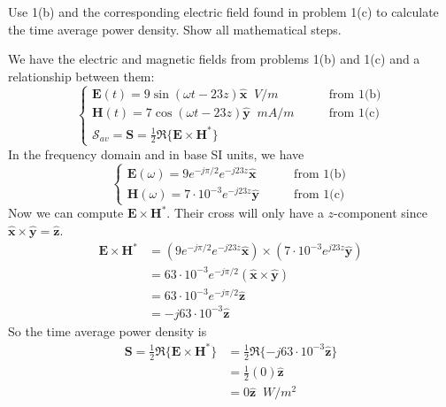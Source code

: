 \documentclass[11pt]{article}
\begin{document}
\begin{homeworkProblem}

Use 1(b) and the corresponding electric field found in problem 1(c) to calculate the time average power density. 
Show all mathematical steps. \vspace{1\baselineskip}

\solution

We have the electric and magnetic fields from problems 1(b) and 1(c) and a relationship between them:
\[\begin{cases}
    \mathbf{E}(t) = 9 \sin (\omega t - 23 z) \hat{\mathbf{x}} \;\; \unit{V/m} &\quad\quad \text{from 1(b)}  \\
    \mathbf{H}(t) = 7 \cos (\omega t - 23 z) \hat{\mathbf{y}} \;\; \unit{mA/m} &\quad\quad \text{from 1(c)} \\
    \bm{\mathscr{S}}_{av} = \mathbf{S} = \frac{1}{2} \Re \{\mathbf{E} \times \mathbf{H}^*\}
\end{cases}\]
In the frequency domain and in base SI units, we have
\[\begin{cases}
    \mathbf{E}(\omega) = 9 e^{-j \pi/2} e^{-j 23 z} \hat{\mathbf{x}} &\quad\quad \text{from 1(b)}  \\
    \mathbf{H}(\omega) = 7\cdot10^{-3} e^{-j 23 z} \hat{\mathbf{y}} &\quad\quad \text{from 1(c)}
\end{cases}\]
Now we can compute $\mathbf{E}\times \mathbf{H}^*$. Their cross will only have a $z$-component since $\hat{\mathbf{x}} \times \hat{\mathbf{y}} = \hat{\mathbf{z}}$.
\begin{align*}
    \mathbf{E} \times \mathbf{H}^* &= (9 e^{-j \pi/2} e^{-j 23 z} \hat{\mathbf{x}}) \times (7\cdot10^{-3} e^{j 23 z} \hat{\mathbf{y}}) \\
    &= 63\cdot10^{-3} e^{-j \pi/2} (\hat{\mathbf{x}} \times \hat{\mathbf{y}}) \\
    &= 63\cdot10^{-3} e^{-j \pi/2} \hat{\mathbf{z}} \\
    &= -j 63\cdot10^{-3} \hat{\mathbf{z}}
\end{align*}
So the time average power density is
\begin{align*}
    \mathbf{S} = \frac{1}{2} \Re \{\mathbf{E} \times \mathbf{H}^*\} &= \frac{1}{2} \Re \{-j 63\cdot10^{-3} \hat{\mathbf{z}}\} \\
    &= \frac{1}{2} (0) \hat{\mathbf{z}} \\
    &= 0 \hat{\mathbf{z}} \;\; \unit{W/m^2}
\end{align*}
\end{homeworkProblem}
\end{document}
